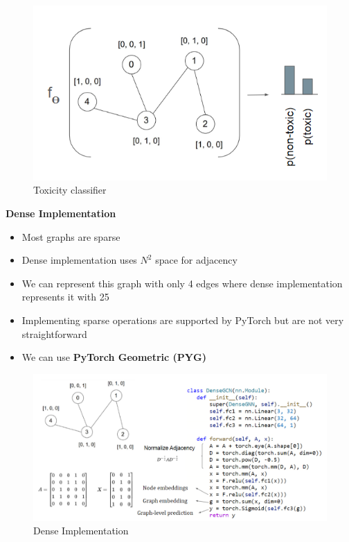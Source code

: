 \begin{figure}[h!t]
    \centering
    \includegraphics[width=0.7\linewidth]{toxicity.png}
    \caption{Toxicity classifier}
    \label{fig:enter-label}
\end{figure}

\noindent \textbf{Dense Implementation}

\begin{itemize}
    \item Most graphs are sparse
    \item Dense implementation uses $N^2$ space for adjacency
    \item We can represent this graph with only 4 edges where dense implementation represents it with 25
    \item Implementing sparse operations are supported by PyTorch but are not very straightforward
    \item We can use \textbf{PyTorch Geometric (PYG)}
\end{itemize}

\begin{figure}[h!t]
    \centering
    \includegraphics[width=1\linewidth]{denseimplementation.png}
    \caption{Dense Implementation}
    \label{fig:enter-label}
\end{figure}

